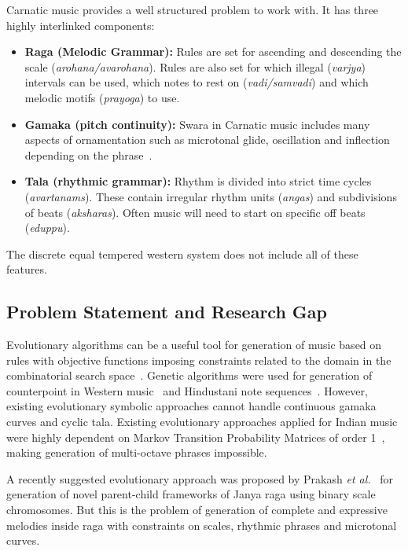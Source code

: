 \documentclass[conference,letterpaper]{IEEEtran}
\newcounter{algorithm}
\begin{document}
Carnatic music provides a well structured problem to work with. It has three highly interlinked components:
\begin{itemize}
    \item \textbf{Raga (Melodic Grammar):} Rules are set for ascending and descending the scale (\textit{arohana/avarohana}). Rules are also set for which illegal (\textit{varjya}) intervals can be used, which notes to rest on (\textit{vadi/samvadi}) and which melodic motifs (\textit{prayoga}) to use.
    \item \textbf{Gamaka (pitch continuity):} Swara in Carnatic music includes many aspects of ornamentation such as microtonal glide, oscillation and inflection depending on the phrase~\cite{gamaka2022}.
    \item \textbf{Tala (rhythmic grammar):} Rhythm is divided into strict time cycles (\textit{avartanams}). These contain irregular rhythm units (\textit{angas}) and subdivisions of beats (\textit{aksharas}). Often music will need to start on specific off beats (\textit{eduppu}).
\end{itemize}
The discrete equal tempered western system does not include all of these features.

\subsection{Problem Statement and Research Gap}
Evolutionary algorithms can be a useful tool for generation of music based on rules with objective functions imposing constraints related to the domain in the combinatorial search space~\cite{herremans2013,majidi2022,mcintyre1994}. Genetic algorithms were used for generation of counterpoint in Western music~\cite{herremans2012,deprisco2020} and Hindustani note sequences~\cite{shukla2023}. However, existing evolutionary symbolic approaches cannot handle continuous gamaka curves and cyclic tala. Existing evolutionary approaches applied for Indian music were highly dependent on Markov Transition Probability Matrices of order 1~\cite{shukla2023}, making generation of multi-octave phrases impossible.

A recently suggested evolutionary approach was proposed by Prakash \textit{et al.}~\cite{prakash2026} for generation of novel parent-child frameworks of Janya raga using binary scale chromosomes. But this is the problem of generation of complete and expressive melodies inside raga with constraints on scales, rhythmic phrases and microtonal curves.
\end{document}

